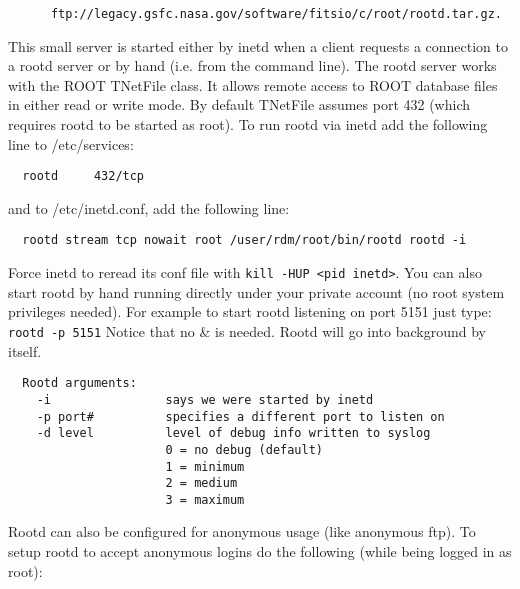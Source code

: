 \documentclass[11pt]{book}
\begin{document}
\begin{verbatim}
      ftp://legacy.gsfc.nasa.gov/software/fitsio/c/root/rootd.tar.gz.
\end{verbatim}

This small server is started either by inetd when a client requests a
connection to a rootd server or by hand (i.e. from the command line).
The rootd server works with the ROOT TNetFile class. It allows remote
access to ROOT database files in either read or write mode. By default
TNetFile assumes port 432 (which requires rootd to be started as root).
To run rootd via inetd add the following line to /etc/services:

\begin{verbatim}
  rootd     432/tcp
\end{verbatim}
and to /etc/inetd.conf, add the following line:

\begin{verbatim}
  rootd stream tcp nowait root /user/rdm/root/bin/rootd rootd -i
\end{verbatim}
Force inetd to reread its conf file with \verb+kill -HUP <pid inetd>+.
You can also start rootd by hand running directly under your private
account (no root system privileges needed). For example to start
rootd listening on port 5151 just type:   \verb+rootd -p 5151+
Notice that no \& is needed. Rootd will go into background by itself.

\begin{verbatim}
  Rootd arguments:
    -i                says we were started by inetd
    -p port#          specifies a different port to listen on
    -d level          level of debug info written to syslog
                      0 = no debug (default)
                      1 = minimum
                      2 = medium
                      3 = maximum
\end{verbatim}
Rootd can also be configured for anonymous usage (like anonymous ftp).
To setup rootd to accept anonymous logins do the following (while being
logged in as root):
\end{document}
